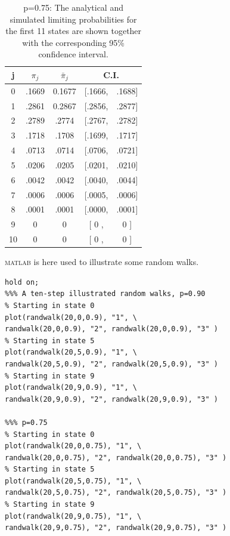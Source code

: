 \begin{table}[!htbp]
\centering
\begin{tabular}{ccccc}
  \hline
  \noalign{\smallskip}
  j & $\pi_j$ & $\bar{\pi}_j$ & \multicolumn{2}{c|}{C.I.} \\
  \hline
  \noalign{\smallskip}
  0   & .1669 & 0.1677 & [.1666,  & .1688]  \\
  1   & .2861 & 0.2867 & [.2856,  & .2877]  \\
  2   & .2789  & .2774 & [.2767,  & .2782]  \\
  3   & .1718  & .1708 & [.1699,  & .1717]  \\
  4   & .0713  & .0714 & [.0706,  & .0721]  \\
  5   & .0206  & .0205 & [.0201,  & .0210]  \\
  6   & .0042  & .0042 & [.0040,  & .0044]  \\
  7   & .0006  & .0006 & [.0005,  & .0006]  \\
  8   & .0001  & .0001 & [.0000,  & .0001]  \\
  9   &   0    &   0   & [   0 ,  &   0  ]  \\
  10  &   0    &   0   & [   0 ,  &   0  ]  \\
\hline
\end{tabular}
\caption{p=0.75: The analytical and simulated limiting probabilities for the first 11 states are shown together with the corresponding 95\% confidence interval.}
\label{lim_p}
\end{table}

\textsc{matlab} is here used to illustrate some random walks.

\begin{verbatim}
hold on;
%%% A ten-step illustrated random walks, p=0.90
% Starting in state 0
plot(randwalk(20,0,0.9), "1", \
randwalk(20,0,0.9), "2", randwalk(20,0,0.9), "3" )
% Starting in state 5
plot(randwalk(20,5,0.9), "1", \
randwalk(20,5,0.9), "2", randwalk(20,5,0.9), "3" )
% Starting in state 9
plot(randwalk(20,9,0.9), "1", \
randwalk(20,9,0.9), "2", randwalk(20,9,0.9), "3" )

%%% p=0.75
% Starting in state 0
plot(randwalk(20,0,0.75), "1", \
randwalk(20,0,0.75), "2", randwalk(20,0,0.75), "3" )
% Starting in state 5
plot(randwalk(20,5,0.75), "1", \
randwalk(20,5,0.75), "2", randwalk(20,5,0.75), "3" )
% Starting in state 9
plot(randwalk(20,9,0.75), "1", \
randwalk(20,9,0.75), "2", randwalk(20,9,0.75), "3" )

\end{verbatim}

